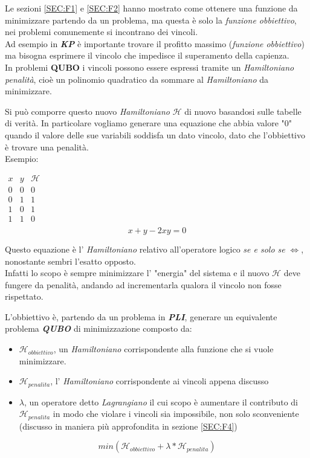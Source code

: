 \documentclass[a4paper]{article}
\newcommand{\imp}[1]{\textbf{\textit{#1}}}
\begin{document}
Le sezioni \ref{SEC:F1} e \ref{SEC:F2} hanno mostrato come ottenere una funzione da minimizzare partendo da un problema, ma questa è solo la \textit{funzione obbiettivo}, nei problemi comunemente si incontrano dei vincoli.\\
Ad esempio in \imp{KP} è importante trovare il profitto massimo (\textit{funzione obbiettivo}) ma bisogna esprimere il vincolo che impedisce il superamento della capienza.\\
In problemi \textbf{QUBO} i vincoli possono essere espressi tramite un \textit{Hamiltoniano penalità}, cioè un polinomio quadratico da sommare al \textit{Hamiltoniano} da minimizzare.

Si può comporre questo nuovo \textit{Hamiltoniano} $\mathcal{H}$ di nuovo basandosi sulle tabelle di verità.
In particolare vogliamo generare una equazione che abbia valore "$0$" quando il valore delle sue variabili soddisfa un dato vincolo, dato che l'obbiettivo è trovare una penalità.\\
Esempio:
\begin{center}$\begin{array}{c|c|c}
 x & y & \mathcal{H}\\
\hline
 0 & 0 & 0  \\ 
 0 & 1 & 1  \\
 1 & 0 & 1  \\
 1 & 1 & 0  \\ %
\end{array}$
$$ x + y -2xy = 0$$
\end{center}
Questo equazione è l' \textit{Hamiltoniano} relativo all'operatore logico \textit{se e solo se} $ \Leftrightarrow$, nonostante sembri l'esatto opposto.\\
Infatti lo scopo è sempre minimizzare l' "energia" del sistema e il nuovo $\mathcal{H}$ deve fungere da penalità, andando ad incrementarla qualora il vincolo non fosse rispettato.

L'obbiettivo è, partendo da un problema in \imp{PLI}, generare un equivalente problema \imp{QUBO} di minimizzazione composto da: 
\begin{itemize}
	\item $\mathcal{H}_{obbiettivo}$, un \textit{Hamiltoniano} corrispondente alla funzione che si vuole minimizzare.
	\item $\mathcal{H}_{penalita}$, l' \textit{Hamiltoniano} corrispondente ai vincoli appena discusso
	\item $\lambda$, un operatore detto \textit{Lagrangiano} il cui scopo è aumentare il contributo di $\mathcal{H}_{penalita}$ in modo che violare i vincoli sia impossibile, non solo sconveniente (discusso in maniera più approfondita in sezione \ref{SEC:F4})
\end{itemize} 
$$ min(\mathcal{H}_{obbiettivo} + \lambda * \mathcal{H}_{penalita})$$
\newpage
\end{document}
